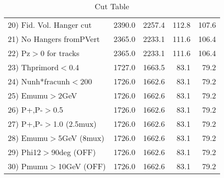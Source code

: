 \begin{table}[h!]
\begin{tabular}{||l||r|r|r|r||}
 20) Fid. Vol. Hanger cut &      2390.0 &      2257.4 &       112.8 &       107.6 \\
 21) No Hangers fromPVert &      2365.0 &      2233.1 &       111.6 &       106.4 \\
 22) Pz$>$0 for tracks    &      2365.0 &      2233.1 &       111.6 &       106.4 \\
 23) Thprimord$<$0.4      &      1727.0 &      1663.5 &        83.1 &        79.2 \\
 24) Nunh*fracunh$<$200   &      1726.0 &      1662.6 &        83.1 &        79.2 \\
 25) Emumu$>$2GeV         &      1726.0 &      1662.6 &        83.1 &        79.2 \\
 26) P+,P-$>$0.5          &      1726.0 &      1662.6 &        83.1 &        79.2 \\
 27) P+,P-$>$1.0 (2.5mux) &      1726.0 &      1662.6 &        83.1 &        79.2 \\
 28) Emumu$>$5GeV  (8mux) &      1726.0 &      1662.6 &        83.1 &        79.2 \\
 29) Phi12$>$90deg  (OFF) &      1726.0 &      1662.6 &        83.1 &        79.2 \\
 30) Pmumu$>$10GeV  (OFF) &      1726.0 &      1662.6 &        83.1 &        79.2 \\
 \hline
 \hline
 \end{tabular}
 \caption{Cut Table \cohrp  }
 \label{tab-cut_crhop}
 \end{table}
